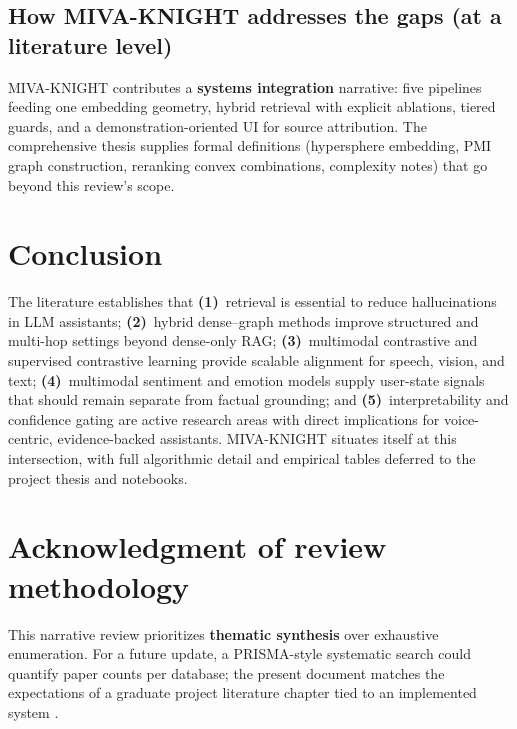 \documentclass[12pt,a4paper]{article}
\begin{document}
\subsection{How MIVA-KNIGHT addresses the gaps (at a literature level)}

MIVA-KNIGHT contributes a \textbf{systems integration} narrative: five pipelines feeding one embedding geometry, hybrid retrieval with explicit ablations, tiered guards, and a demonstration-oriented UI for source attribution. The comprehensive thesis supplies formal definitions (hypersphere embedding, PMI graph construction, reranking convex combinations, complexity notes) that go beyond this review's scope.

\section{Conclusion}

The literature establishes that \textbf{(1)}~retrieval is essential to reduce hallucinations in LLM assistants; \textbf{(2)}~hybrid dense--graph methods improve structured and multi-hop settings beyond dense-only RAG; \textbf{(3)}~multimodal contrastive and supervised contrastive learning provide scalable alignment for speech, vision, and text; \textbf{(4)}~multimodal sentiment and emotion models supply user-state signals that should remain separate from factual grounding; and \textbf{(5)}~interpretability and confidence gating are active research areas with direct implications for voice-centric, evidence-backed assistants. MIVA-KNIGHT situates itself at this intersection, with full algorithmic detail and empirical tables deferred to the project thesis and notebooks.

\section*{Acknowledgment of review methodology}

This narrative review prioritizes \textbf{thematic synthesis} over exhaustive enumeration. For a future update, a PRISMA-style systematic search could quantify paper counts per database; the present document matches the expectations of a graduate project literature chapter tied to an implemented system \cite{hart1998doing}.



\end{document}
